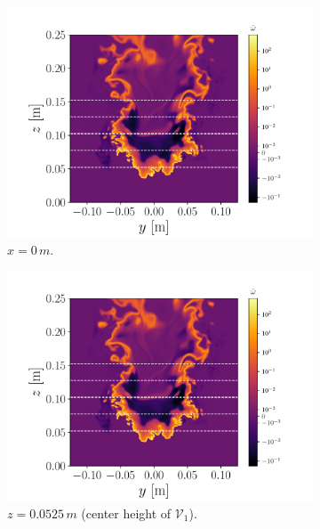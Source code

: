 \documentclass[review]{elsarticle}
\begin{document}
\begin{figure}[!tbp]%
  \centering%
  \begin{subfigure}[t]{0.48\textwidth}%
    \includegraphics[page=1,width=\textwidth]{./figs/src_pv.pdf}%
    \caption{$x=0\,\unit{m}$.}%
  \end{subfigure}\hfill%
  \begin{subfigure}[t]{0.48\textwidth}%
    \includegraphics[page=2,width=\textwidth]{./figs/src_pv.pdf}%
    \caption{$z=0.0525\,\unit{m}$ (center height of $\mathcal{V}_{1}$).}%
  \end{subfigure}\\%
  \begin{subfigure}[t]{0.48\textwidth}%

\end{subfigure}
\end{figure}
\end{document}
